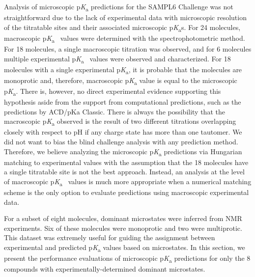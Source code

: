 \documentclass[9pt,lineno,final]{elife}
\newcommand{\pKa}{p\textit{K}\textsubscript{a}}
\begin{document}
Analysis of microscopic \pKa{} predictions for the SAMPL6 Challenge was not straightforward due to the lack of experimental data with microscopic resolution of the titratable sites and their associated microscopic \pKa{}s. 
For 24 molecules, macroscopic \pKa{}~ values were determined with the spectrophotometric method. 
For 18 molecules, a single macroscopic titration was observed, and for 6 molecules multiple experimental \pKa{}~ values were observed and characterized. 
For 18 molecules with a single experimental \pKa{}, it is probable that the molecules are monoprotic and, therefore, macroscopic \pKa{} value is equal to the microscopic \pKa{}.
There is, however, no direct experimental evidence supporting this hypothesis aside from the support from computational predictions, such as the predictions by ACD/pKa Classic. 
There is always the possibility that the macroscopic \pKa{} observed is the result of two different titrations overlapping closely with respect to pH if any charge state has more than one tautomer. 
We did not want to bias the blind challenge analysis with any prediction method. 
Therefore, we believe analyzing the microscopic \pKa{} predictions via Hungarian matching to experimental values with the assumption that the 18 molecules have a single titratable site is not the best approach. 
Instead, an analysis at the level of macroscopic \pKa{}~ values is much more appropriate when a numerical matching scheme is the only option to evaluate predictions using macroscopic experimental data.

For a subset of eight molecules, dominant microstates were inferred from NMR experiments. 
Six of these molecules were monoprotic and two were multiprotic.
This dataset was extremely useful for guiding the assignment between experimental and predicted \pKa{} values based on microstates. 
In this section, we present the performance evaluations of microscopic \pKa{} predictions for only the 8 compounds with experimentally-determined dominant microstates.
\end{document}
